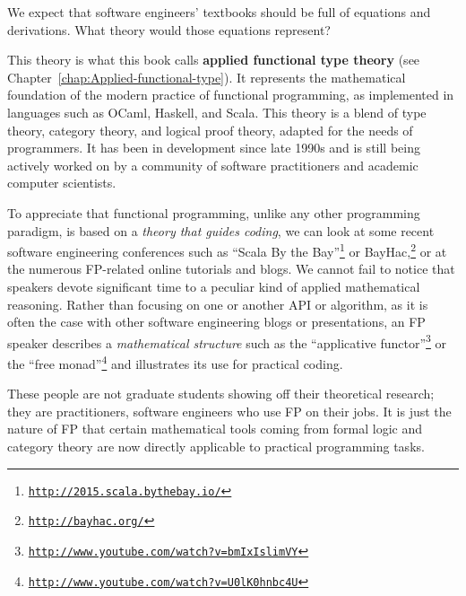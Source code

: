 We expect that software engineers\textsf{'} textbooks should be full
of equations and derivations. What theory would those equations represent?

This theory is what this book calls \textbf{applied functional type
theory} (see Chapter~\ref{chap:Applied-functional-type}).
It represents the mathematical foundation of the modern practice of
functional programming, as implemented in languages such as OCaml,
Haskell, and Scala. This theory is a blend of type theory, category
theory, and logical proof theory, adapted for the needs of programmers.
It has been in development since late 1990s and is still being actively
worked on by a community of software practitioners and academic computer
scientists.

To appreciate that functional programming, unlike any other programming
paradigm, is based on a \emph{theory that guides coding}, we can look
at some recent software engineering conferences such as \textsf{``}Scala By
the Bay\textsf{''}\footnote{\texttt{\href{http://2015.scala.bythebay.io/}{http://2015.scala.bythebay.io/}}}
or BayHac,\footnote{\texttt{\href{http://bayhac.org/}{http://bayhac.org/}}}
or at the numerous FP-related online tutorials and blogs. We cannot
fail to notice that speakers devote significant time to a peculiar
kind of applied mathematical reasoning. Rather than focusing on one
or another API or algorithm, as it is often the case with other software
engineering blogs or presentations, an FP speaker describes a \emph{mathematical
structure} \textemdash{} such as the \textsf{``}applicative functor\textsf{''}\footnote{\texttt{\href{http://www.youtube.com/watch?v=bmIxIslimVY}{http://www.youtube.com/watch?v=bmIxIslimVY}}}
or the \textsf{``}free monad\textsf{''}\footnote{\texttt{\href{http://www.youtube.com/watch?v=U0lK0hnbc4U}{http://www.youtube.com/watch?v=U0lK0hnbc4U}}}
\textemdash{} and illustrates its use for practical coding.

These people are not graduate students showing off their theoretical
research; they are practitioners, software engineers who use FP on
their jobs. It is just the nature of FP that certain mathematical
tools \textemdash{} coming from formal logic and category theory \textemdash{}
are now directly applicable to practical programming tasks.

